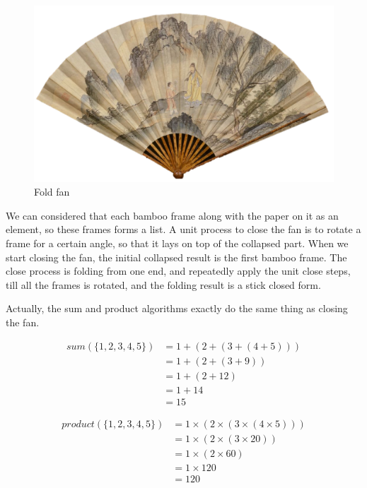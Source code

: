 \documentclass[b5paper]{article}
\begin{document}
\begin{figure}[htbp]
  \centering
  \includegraphics[scale=0.4]{img/fold-fan.png}
  \caption{Fold fan}
  \label{fig:fold-fan}
\end{figure}

We can considered that each bamboo frame along with the paper on it as an element, so these frames forms a
list. A unit process to close the fan is to rotate a frame for a certain angle, so that it lays on top
of the collapsed part. When we start closing the fan, the initial collapsed result is the first bamboo frame.
The close process is folding from one end, and repeatedly apply the unit close steps, till all the frames
is rotated, and the folding result is a stick closed form.

Actually, the sum and product algorithms exactly do the same thing as closing the fan.

\[
\begin{array}{rl}
sum(\{1, 2, 3, 4, 5 \}) & = 1 + (2 + (3 + (4 + 5))) \\
         & = 1 + (2 + (3 + 9)) \\
         & = 1 + (2 + 12) \\
         & = 1 + 14 \\
         & = 15
\end{array}
\]

\[
\begin{array}{rl}
product(\{1, 2, 3, 4, 5 \}) & = 1 \times (2 \times (3 \times (4 \times 5))) \\
         & = 1 \times (2 \times (3 \times 20)) \\
         & = 1 \times (2 \times 60) \\
         & = 1 \times 120 \\
         & = 120
\end{array}
\]
\end{document}
